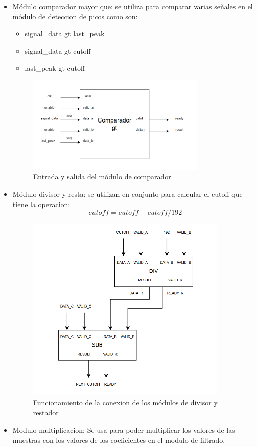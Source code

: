 \begin{itemize}
    \item Módulo comparador mayor que: se utiliza para comparar varias señales en el módulo de deteccion de picos como son:
    \begin{itemize}
        \item signal\_data gt last\_peak
        \item signal\_data gt cutoff
        \item last\_peak gt cutoff
    \end{itemize}

    \begin{figure}[h!]
        \centering
        \includegraphics[width=0.8\textwidth]{./Images/img_implementacion_hw/comparadorgt.png}
        \caption{Entrada y salida del módulo de comparador}
        \label{fig:comparadorgt}
    \end{figure}

    \item Módulo divisor y resta: se utilizan en conjunto para calcular el cutoff que tiene la operacion:
    \[cutoff = cutoff - cutoff/192\]
    \begin{figure}[h!]
        \centering
        \includegraphics[width=0.9\textwidth]{./Images/img_implementacion_hw/DiagramaDivisorrestador.png}
        \caption{Funcionamiento de la conexion de los módulos de divisor y restador}
        \label{fig:divisorrestador}
    \end{figure}   
    \item Modulo multiplicacion: Se usa para poder multiplicar los valores de las muestras con los valores de los coeficientes en el modulo de filtrado.
\end{itemize}
